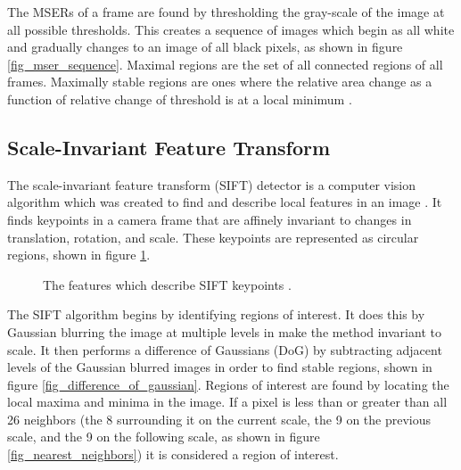 \documentclass[oneside,11pt]{Latex/Classes/PhDthesisPSnPDF}
\begin{document}
The MSERs of a frame are found by thresholding the gray-scale of the image at all possible thresholds.  This creates a sequence of images which begin as all white and gradually changes to an image of all black pixels, as shown in figure \ref{fig_mser_sequence}.  Maximal regions are the set of all connected regions of all frames.  Maximally stable regions are ones where the relative area change as a function of relative change of threshold is at a local minimum \cite{matas_02}.

\subsection{Scale-Invariant Feature Transform}

The scale-invariant feature transform (SIFT) detector is a computer vision algorithm which was created to find and describe local features in an image \cite{lowe_99}.  It finds keypoints in a camera frame that are affinely invariant to changes in translation, rotation, and scale.  These keypoints are represented as circular regions, shown in figure \ref{fig_sift_features}.

\begin{figure}[h!]
  \caption{\label{fig_sift_features} The features which describe SIFT keypoints \cite{marano_09}.}
\end{figure}

The SIFT algorithm begins by identifying regions of interest.  It does this by Gaussian blurring the image at multiple levels in make the method invariant to scale.  It then performs a difference of Gaussians (DoG) by subtracting adjacent levels of the Gaussian blurred images in order to find stable regions, shown in figure \ref{fig_difference_of_gaussian}.  Regions of interest are found by locating the local maxima and minima in the image.  If a pixel is less than or greater than all 26 neighbors (the 8 surrounding it on the current scale, the 9 on the previous scale, and the 9 on the following scale, as shown in figure \ref{fig_nearest_neighbors}) it is considered a region of interest.
\end{document}
